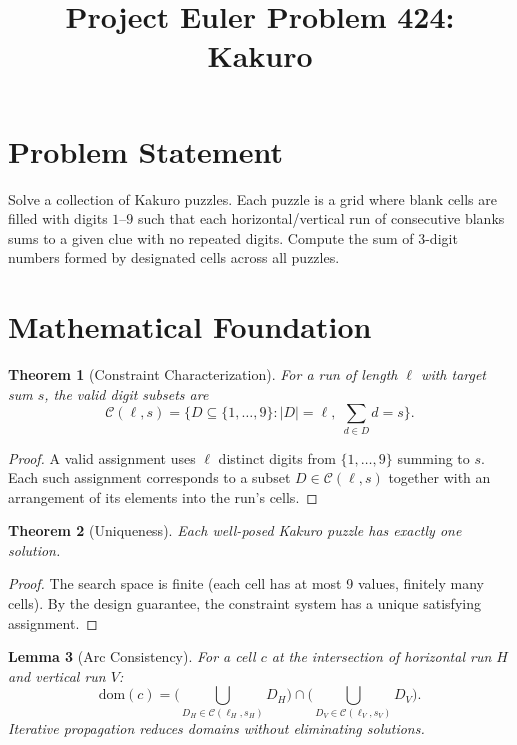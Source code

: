 \documentclass[12pt]{article}
\title{Project Euler Problem 424: Kakuro}
\author{}
\date{}
\newtheorem{theorem}{Theorem}
\newtheorem{lemma}[theorem]{Lemma}
\begin{document}
\maketitle

\section{Problem Statement}
Solve a collection of Kakuro puzzles. Each puzzle is a grid where blank cells are filled with digits $1$--$9$ such that each horizontal/vertical run of consecutive blanks sums to a given clue with no repeated digits. Compute the sum of 3-digit numbers formed by designated cells across all puzzles.

\section{Mathematical Foundation}

\begin{theorem}[Constraint Characterization]
For a run of length $\ell$ with target sum $s$, the valid digit subsets are
\[
\mathcal{C}(\ell, s) = \{D \subseteq \{1,\ldots,9\} : |D| = \ell,\; \textstyle\sum_{d \in D} d = s\}.
\]
\end{theorem}

\begin{proof}
A valid assignment uses $\ell$ distinct digits from $\{1,\ldots,9\}$ summing to $s$. Each such assignment corresponds to a subset $D \in \mathcal{C}(\ell,s)$ together with an arrangement of its elements into the run's cells.
\end{proof}

\begin{theorem}[Uniqueness]
Each well-posed Kakuro puzzle has exactly one solution.
\end{theorem}

\begin{proof}
The search space is finite (each cell has at most 9 values, finitely many cells). By the design guarantee, the constraint system has a unique satisfying assignment.
\end{proof}

\begin{lemma}[Arc Consistency]
For a cell $c$ at the intersection of horizontal run $H$ and vertical run $V$:
\[
\mathrm{dom}(c) = \biggl(\bigcup_{D_H \in \mathcal{C}(\ell_H, s_H)} D_H\biggr) \cap \biggl(\bigcup_{D_V \in \mathcal{C}(\ell_V, s_V)} D_V\biggr).
\]
Iterative propagation reduces domains without eliminating solutions.
\end{lemma}
\end{document}
